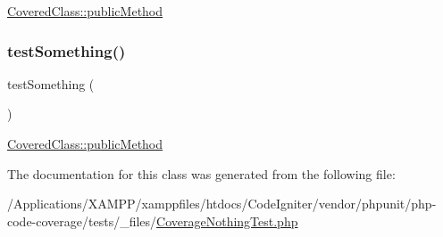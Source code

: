 \mbox{\hyperlink{class_covered_class_ab07dfd901b43d1dcdbc2d116d7f5a566}{Covered\+Class\+::public\+Method}}  \mbox{\label{class_coverage_nothing_test_a0fc4e17369bc9607ebdd850d9eda8167}} 
\subsubsection{\texorpdfstring{test\+Something()}{testSomething()}\hspace{0.1cm}{\footnotesize\ttfamily [2/2]}}
{\footnotesize\ttfamily test\+Something (\begin{DoxyParamCaption}{ }\end{DoxyParamCaption})}

\mbox{\hyperlink{class_covered_class_ab07dfd901b43d1dcdbc2d116d7f5a566}{Covered\+Class\+::public\+Method}}  

The documentation for this class was generated from the following file\+:\begin{DoxyCompactItemize}
\item 
/\+Applications/\+X\+A\+M\+P\+P/xamppfiles/htdocs/\+Code\+Igniter/vendor/phpunit/php-\/code-\/coverage/tests/\+\_\+files/\mbox{\hyperlink{php-code-coverage_2tests_2__files_2_coverage_nothing_test_8php}{Coverage\+Nothing\+Test.\+php}}\end{DoxyCompactItemize}
